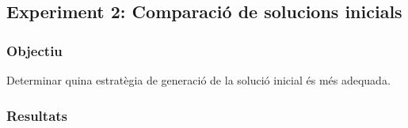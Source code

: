 \subsection{Experiment 2: Comparació de solucions inicials}

\subsubsection{Objectiu}
Determinar quina estratègia de generació de la solució inicial és més adequada.

\subsubsection{Resultats}





